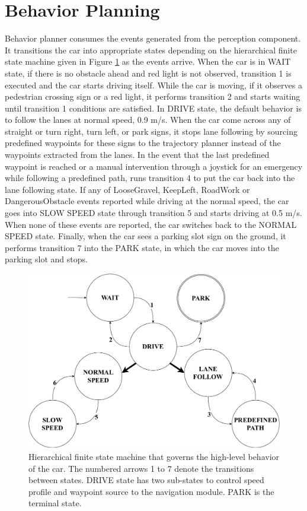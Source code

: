 \section{Behavior Planning}

Behavior planner consumes the events generated from the perception component.
It transitions the car into appropriate states depending on the hierarchical
finite state machine given in Figure \ref{figure:hfsm} as the events arrive.
When the car is in WAIT state, if there is no obstacle ahead and red light is
not observed, transition 1 is executed and the car starts driving itself. While
the car is moving, if it observes a pedestrian crossing sign or a red light, it
performs transition 2 and starts waiting until transition 1 conditions are
satisfied. In DRIVE state, the default behavior is to follow the lanes at
normal speed, 0.9 m/s. When the car come across any of straight or turn right,
turn left, or park signs, it stops lane following by sourcing predefined
waypoints for these signs to the trajectory planner instead of the waypoints
extracted from the lanes. In the event that the last predefined waypoint is
reached or a manual intervention through a joystick for an emergency while
following a predefined path, runs transition 4 to put the car back into the
lane following state. If any of LooseGravel, KeepLeft, RoadWork or
DangerousObstacle events reported while driving at the normal speed, the car
goes into SLOW SPEED state through transition 5 and starts driving at 0.5 m/s.
When none of these events are reported, the car switches back to the NORMAL
SPEED state. Finally, when the car sees a parking slot sign on the ground, it
performs transition 7 into the PARK state, in which the car moves into the
parking slot and stops.

\begin{figure}[h]
\centering
\includegraphics[width=.8\textwidth]{figures/hfsm.pdf}
\caption{Hierarchical finite state machine that governs the high-level behavior
of the car. The numbered arrows 1 to 7 denote the transitions between states.
DRIVE state has two sub-states to control speed profile and waypoint source to
the navigation module. PARK is the terminal state.}
\label{figure:hfsm}
\end{figure}
